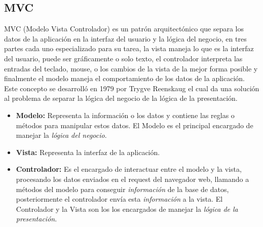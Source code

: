 \subsection{MVC} %
\label{sub:mvc}
  MVC (Modelo Vista  Controlador) es un patrón arquitectónico que separa
  los datos de la aplicación en la interfaz del usuario y  la lógica del
  negocio, en tres partes cada uno especializado para su tarea, la vista
  maneja lo que es la interfaz del usuario, puede ser gráficamente o solo texto,
  el controlador interpreta las entradas del teclado, mouse, o los cambios
  de la vista de la mejor forma posible y finalmente el modelo maneja el comportamiento
  de los datos de la aplicación.\cite{steveburbeck1992}\\

  Este concepto se desarrolló en 1979 por Trygve Reenskaug el cual da una
  solución al problema de separar la lógica del negocio de la lógica de la presentación.\\


  \begin{itemize}
    \item \textbf{Modelo:} Representa la información o los datos y contiene las reglas o métodos para manipular estos datos.
    El Modelo es el principal encargado de manejar  la \emph{lógica del negocio}.


    \item \textbf{Vista:}  Representa la interfaz de la aplicación.

    \item \textbf{Controlador:} Es el encargado de interactuar entre el modelo y la vista, procesando los datos enviados en el request del navegador web,
        llamando a métodos del modelo para conseguir  \emph{información} de la base de datos,
        posteriormente el controlador envía esta \emph{información} a la vista.
        El Controlador y la Vista son los los encargados de manejar  la \emph{lógica de la presentación}.
  \end{itemize}




